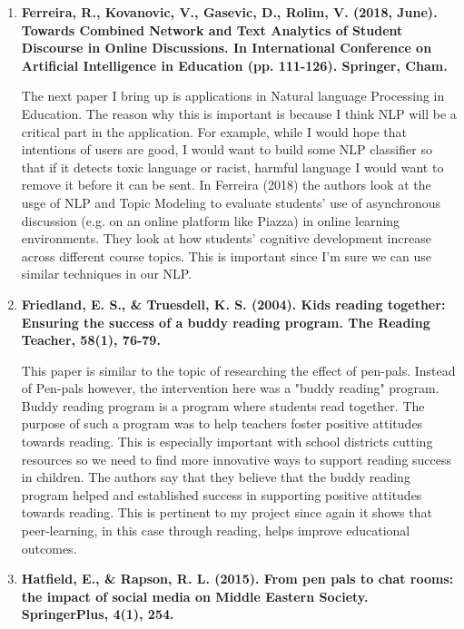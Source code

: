 \documentclass[12pt, final]{article}
\begin{document}
\begin{enumerate}
\item \textbf{Ferreira, R., Kovanovic, V., Gasevic, D., Rolim, V. (2018, June). Towards Combined Network and Text Analytics of Student Discourse in Online Discussions. In International Conference on Artificial Intelligence in Education (pp. 111-126). Springer, Cham.}

The next paper I bring up is applications in Natural language Processing in Education. The reason why this is important is because I think NLP will be a critical part in the application. For example, while I would hope that intentions of users are good, I would want to build some NLP classifier so that if it detects toxic language or racist, harmful language I would want to remove it before it can be sent. In Ferreira (2018) the authors look at the usge of NLP and Topic Modeling to evaluate students' use of asynchronous discussion (e.g. on an online platform like Piazza) in online learning environments. They look at how students' cognitive development increase across different course topics. This is important since I'm sure we can use similar techniques in our NLP. 

\item \textbf{Friedland, E. S., \& Truesdell, K. S. (2004). Kids reading together: Ensuring the success of a buddy reading program. The Reading Teacher, 58(1), 76-79.}

This paper is similar to the topic of researching the effect of pen-pals. Instead of Pen-pals however, the intervention here was a "buddy reading" program. Buddy reading program is a program where students read together. The purpose of such a program was to help teachers foster positive attitudes towards reading. This is especially important with school districts cutting resources so we need to find more innovative ways to support reading success in children. The authors say that they believe that the buddy reading program helped and established success in supporting positive attitudes towards reading. This is pertinent to my project since again it shows that peer-learning, in this case through reading, helps improve educational outcomes.

\item \textbf{Hatfield, E., \& Rapson, R. L. (2015). From pen pals to chat rooms: the impact of social media on Middle Eastern Society. SpringerPlus, 4(1), 254.}


\end{enumerate}
\end{document}
